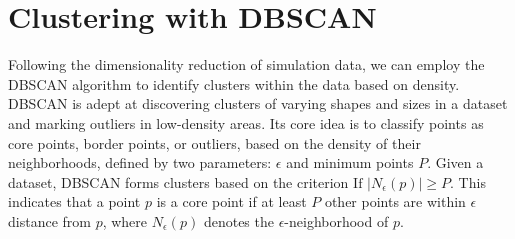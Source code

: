 \section{Clustering with DBSCAN}
Following the dimensionality reduction of simulation data, we can employ the DBSCAN algorithm to identify clusters within the data based on density. DBSCAN is adept at discovering clusters of varying shapes and sizes in a dataset and marking outliers in low-density areas. Its core idea is to classify points as core points, border points, or outliers, based on the density of their neighborhoods, defined by two parameters: $\epsilon$ and minimum points $P$. Given a dataset, DBSCAN forms clusters based on the criterion $\text{If } |N_\epsilon(p)| \geq P$. This indicates that a point $p$ is a core point if at least $P$ other points are within $\epsilon$ distance from $p$, where $N_\epsilon(p)$ denotes the $\epsilon$-neighborhood of $p$.
